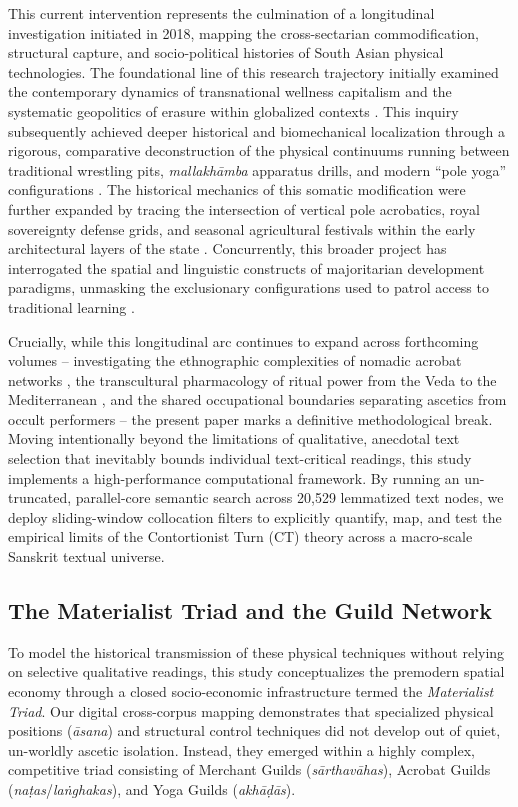 \documentclass[11pt,twoside,letterpaper]{article}
\begin{document}
This current intervention represents the culmination of a longitudinal investigation initiated in 2018, mapping the cross-sectarian commodification, structural capture, and socio-political histories of South Asian physical technologies. The foundational line of this research trajectory initially examined the contemporary dynamics of transnational wellness capitalism and the systematic geopolitics of erasure within globalized contexts \citep{McCartney2021}. This inquiry subsequently achieved deeper historical and biomechanical localization through a rigorous, comparative deconstruction of the physical continuums running between traditional wrestling pits, \textit{mallakhāmba} apparatus drills, and modern ``pole yoga'' configurations \citep{McCartney2023}. The historical mechanics of this somatic modification were further expanded by tracing the intersection of vertical pole acrobatics, royal sovereignty defense grids, and seasonal agricultural festivals within the early architectural layers of the state \citep{McCartney2025}. Concurrently, this broader project has interrogated the spatial and linguistic constructs of majoritarian development paradigms, unmasking the exclusionary configurations used to patrol access to traditional learning \citep{McCartney2026}. 

Crucially, while this longitudinal arc continues to expand across forthcoming volumes -- investigating the ethnographic complexities of nomadic acrobat networks \citep{McCartneyForthcomingA}, the transcultural pharmacology of ritual power from the Veda to the Mediterranean \citep{McCartneyForthcomingB}, and the shared occupational boundaries separating ascetics from occult performers \citep{McCartneyForthcomingC} -- the present paper marks a definitive methodological break. Moving intentionally beyond the limitations of qualitative, anecdotal text selection that inevitably bounds individual text-critical readings, this study implements a high-performance computational framework. By running an un-truncated, parallel-core semantic search across 20,529 lemmatized text nodes, we deploy sliding-window collocation filters to explicitly quantify, map, and test the empirical limits of the Contortionist Turn (CT) theory across a macro-scale Sanskrit textual universe.


\subsection{The Materialist Triad and the Guild Network}
To model the historical transmission of these physical techniques without relying on selective qualitative readings, this study conceptualizes the premodern spatial economy through a closed socio-economic infrastructure termed the \textit{Materialist Triad}. Our digital cross-corpus mapping demonstrates that specialized physical positions (\textit{āsana}) and structural control techniques did not develop out of quiet, un-worldly ascetic isolation. Instead, they emerged within a highly complex, competitive triad consisting of Merchant Guilds (\textit{sārthavāhas}), Acrobat Guilds (\textit{naṭas}/\textit{laṅghakas}), and Yoga Guilds (\textit{akhāḍās}).
\end{document}
